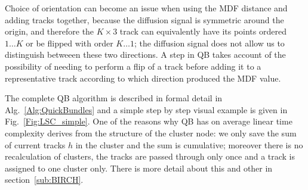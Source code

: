 \documentclass[preprint,authoryear,a4paper,10pt,onecolumn]{elsarticle}
\begin{document}
Choice of orientation can become an issue when using the MDF distance
and adding tracks together, because the diffusion signal is symmetric
around the origin, and therefore the $K \times 3$ track can equivalently
have its points ordered $1 \dots K$ or be flipped with order $K \dots
1$; the diffusion signal does not allow us to distinguish betweeen these
two directions. A step in QB takes account of the possibility of needing
to perform a flip of a track before adding it to a representative track
according to which direction produced the MDF value.

The complete QB algorithm is described in formal detail in
Alg.~\ref{Alg:QuickBundles} and a simple step by step visual example is given in
Fig.~\ref{Fig:LSC_simple}.  One of the reasons why QB has on average linear time
complexity derives from the structure of the cluster node: we only save the sum
of current tracks $h$ in the cluster and the sum is cumulative; moreover there
is no recalculation of clusters, the tracks are passed through only once and a
track is assigned to one cluster only.  There is more detail about this and other in
section~\ref{sub:BIRCH}.
\end{document}
